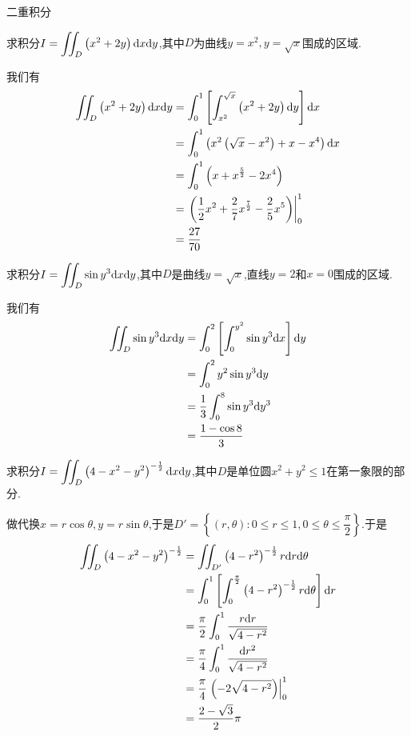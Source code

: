\documentclass{ctexart}
\begin{document}
\pagestyle{empty}
\begin{center}\large 二重积分\end{center}
\begin{problem}[1.]
    求积分$\displaystyle I=\iint_D\left(x^2+2y\right)\mathrm{d} x\mathrm{d} y$,其中$D$为曲线$y=x^2,y=\sqrt{x}$围成的区域.
\end{problem}
\begin{solution}
    我们有
    \[\begin{aligned}
        \iint_D\left(x^2+2y\right)\mathrm{d} x\mathrm{d} y
        &= \int_0^1\left[\int_{x^2}^{\sqrt{x}}\left(x^2+2y\right)\mathrm{d} y\right]\mathrm{d} x \\
        &= \int_0^1\left(x^2\left(\sqrt{x}-x^2\right)+x-x^4\right)\mathrm{d} x \\
        &= \int_0^1\left(x+x^{\frac52}-2x^4\right) \\
        &= \left.\left(\dfrac12x^2+\dfrac27x^{\frac72}-\dfrac25x^5\right)\right|_0^1 \\
        &= \dfrac{27}{70}
    \end{aligned}\]
\end{solution}
\begin{problem}[2.]
    求积分$\displaystyle I=\iint_D\sin y^3\mathrm{d} x\mathrm{d} y$,其中$D$是曲线$y=\sqrt x$,直线$y=2$和$x=0$围成的区域.
\end{problem}
\begin{solution}
    我们有
    \[\begin{aligned}
        \iint_D\sin y^3\mathrm{d} x\mathrm{d} y
        &= \int_0^2\left[\int_0^{y^2}\sin y^3\mathrm{d} x\right]\mathrm{d} y \\
        &= \int_0^2y^2\sin y^3\mathrm{d} y \\
        &= \dfrac13\int_0^8 \sin y^3\mathrm{d} y^3 \\
        &= \dfrac{1-\cos 8}{3}
    \end{aligned}\]
\end{solution}
\begin{problem}[3.]
    求积分$\displaystyle I=\iint_D\left(4-x^2-y^2\right)^{-\frac12}\mathrm{d} x\mathrm{d} y$,其中$D$是单位圆$x^2+y^2\leqslant1$在第一象限的部分.
\end{problem}
\begin{solution}
    做代换$x=r\cos\theta,y=r\sin\theta$,于是$D'=\left\{(r,\theta):0\leqslant r\leqslant 1,0\leqslant\theta\leqslant\dfrac\pi2\right\}$.于是
    \[\begin{aligned}
        \iint_D\left(4-x^2-y^2\right)^{-\frac{1}{2}}
        &= \iint_{D'}\left(4-r^2\right)^{-\frac12}r\mathrm{d} r\mathrm{d}\theta \\
        &= \int_0^1\left[\int_0^{\frac\pi2}\left(4-r^2\right)^{-\frac12}r\mathrm{d}\theta\right]\mathrm{d} r \\
        &= \dfrac\pi2\int_0^1\dfrac{r\mathrm{d} r}{\sqrt{4-r^2}} \\
        &= \dfrac\pi4\int_0^1\dfrac{\mathrm{d} r^2}{\sqrt{4-r^2}} \\
        &= \dfrac\pi4\left.\left(-2\sqrt{4-r^2}\right)\right|_0^1 \\
        &= \dfrac{2-\sqrt3}{2}\pi
    \end{aligned}\]
\end{solution}
\end{document}
